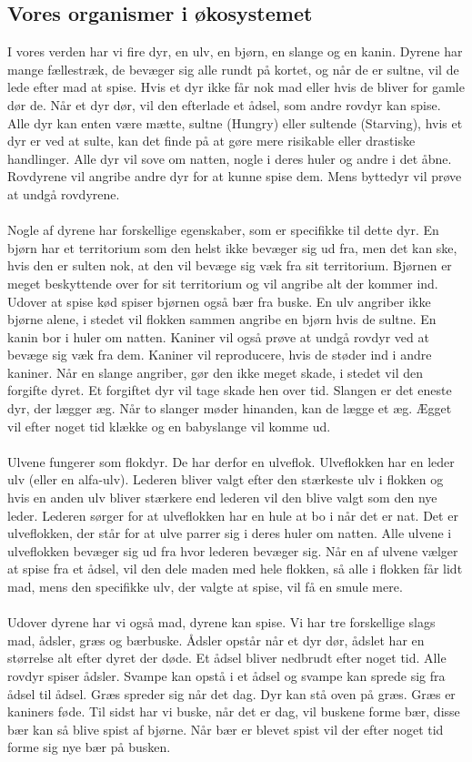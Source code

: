 \documentclass[12pt]{article}
\begin{document}
    \subsection{Vores organismer i økosystemet}I vores verden har vi fire dyr, en ulv, en bjørn, en slange og en kanin. Dyrene har mange fællestræk, de bevæger sig alle rundt på kortet, og når de er sultne, vil de lede efter mad at spise. Hvis et dyr ikke får nok mad eller hvis de bliver for gamle dør de. Når et dyr dør, vil den efterlade et ådsel, som andre rovdyr kan spise.
    Alle dyr kan enten være mætte, sultne (Hungry) eller sultende (Starving), hvis et dyr er ved at sulte, kan det finde på at gøre mere risikable eller drastiske handlinger.
    Alle dyr vil sove om natten, nogle i deres huler og andre i det åbne.
    Rovdyrene vil angribe andre dyr for at kunne spise dem. Mens byttedyr vil prøve at undgå rovdyrene.
    \\ 
    \\
    Nogle af dyrene har forskellige egenskaber, som er specifikke til dette dyr.
    En bjørn har et territorium som den helst ikke bevæger sig ud fra, men det kan ske, hvis den er sulten nok, at den vil bevæge sig væk fra sit territorium. Bjørnen er meget beskyttende over for sit territorium og vil angribe alt der kommer ind. Udover at spise kød spiser bjørnen også bær fra buske.
    En ulv angriber ikke bjørne alene, i stedet vil flokken sammen angribe en bjørn hvis de sultne.
    En kanin bor i huler om natten. Kaniner vil også prøve at undgå rovdyr ved at bevæge sig væk fra dem. Kaniner vil reproducere, hvis de støder ind i andre kaniner.
    Når en slange angriber, gør den ikke meget skade, i stedet vil den forgifte dyret. Et forgiftet dyr vil tage skade hen over tid. Slangen er det eneste dyr, der lægger æg. Når to slanger møder hinanden, kan de lægge et æg. Ægget vil efter noget tid klække og en babyslange vil komme ud.
    \\
    \\
    Ulvene fungerer som flokdyr. De har derfor en ulveflok. Ulveflokken har en leder ulv (eller en alfa-ulv). Lederen bliver valgt efter den stærkeste ulv i flokken og hvis en anden ulv bliver stærkere end lederen vil den blive valgt som den nye leder. Lederen sørger for at ulveflokken har en hule at bo i når det er nat. Det er ulveflokken, der står for at ulve parrer sig i deres huler om natten. Alle ulvene i ulveflokken bevæger sig ud fra hvor lederen bevæger sig. Når en af ulvene vælger at spise fra et ådsel, vil den dele maden med hele flokken, så alle i flokken får lidt mad, mens den specifikke ulv, der valgte at spise, vil få en smule mere.
    \\
    \\
    Udover dyrene har vi også mad, dyrene kan spise. Vi har tre forskellige slags mad, ådsler, græs og bærbuske.
    Ådsler opstår når et dyr dør, ådslet har en størrelse alt efter dyret der døde. Et ådsel bliver nedbrudt efter noget tid. Alle rovdyr spiser ådsler.
    Svampe kan opstå i et ådsel og svampe kan sprede sig fra ådsel til ådsel.
    Græs spreder sig når det dag. Dyr kan stå oven på græs. Græs er kaniners føde.
    Til sidst har vi buske, når det er dag, vil buskene forme bær, disse bær kan så blive spist af bjørne. Når bær er blevet spist vil der efter noget tid forme sig nye bær på busken.
    \newpage
\end{document}
